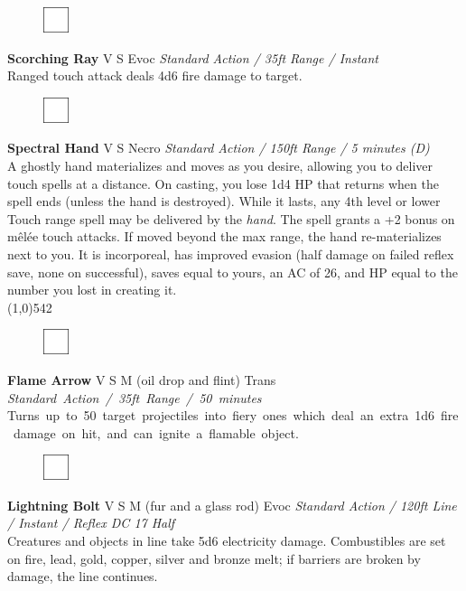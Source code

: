 \documentclass[letterpaper]{article}
\newcommand{\fullline}{\noindent\line(1,0){542} \\}
\newcommand{\spell}[7]{
\begin{figure}
\vspace{-13pt}
\ifstrequal{#2}{Full}{\includegraphics[width=2em]{Checkbox-Full}}{
                      \includegraphics[width=2em]{Checkbox}}
\ifstrequal{#7}{}{\vspace{-1em}}{\vspace{#7}}
\end{figure}
\noindent \textbf{#1} #3 {
    \ifstrequal{#4}{Conj}{\color{Plum}Conj}{%
    \ifstrequal{#4}{Divin}{\color{YellowOrange}Divin}{%
    \ifstrequal{#4}{Ench}{\color{VioletRed}Ench}{%
    \ifstrequal{#4}{Trans}{\color{LimeGreen}Trans}{%
    \ifstrequal{#4}{Evoc}{\color{RedOrange}Evoc}{%
    \ifstrequal{#4}{Illu}{\color{ProcessBlue}Illu}{%
    \ifstrequal{#4}{Abjur}{\color{CadetBlue}Abjur}{%
    \ifstrequal{#4}{Necro}{\color{Red}Necro}{%
}}}}}}}}}
{\footnotesize \emph{#5}} \\
#6
}
\begin{document}
\spell{Scorching Ray}{}{V S}{Evoc}{Standard Action / 35ft Range / Instant}{%
Ranged touch attack deals 4d6 fire damage to target.}{}\\[-1em] %

\spell{Spectral Hand}{}{V S}{Necro}{\emph{Standard Action / 150ft Range / 5 minutes (D)}}{%
A ghostly hand materializes and moves as you desire, allowing you to deliver touch spells at a distance.  On casting, you lose 1d4 HP that returns when the spell ends (unless the hand is destroyed).  While it lasts, any 4th level or lower Touch range spell may be delivered by the \emph{hand}.  The spell grants a +2 bonus on m\^{e}l\'{e}e touch attacks. If moved beyond the max range, the hand re-materializes next to you.  It is incorporeal, has improved evasion (half damage on failed reflex save, none on successful), saves equal to yours, an AC of 26, and HP equal to the number you lost in creating it.}{2em}\\[-2em] %

\fullline
\vspace{-1.25em}


\spell{Flame Arrow}{}{V S M (oil drop and flint)}{Trans}{\mbox{Standard Action / 35ft Range / 50 minutes}}{%
\mbox{Turns up to 50 target projectiles into fiery ones which deal an extra 1d6 fire damage on hit, and can ignite a flamable object.}}{}\\[-1em] %

\spell{Lightning Bolt}{}{V S M (fur and a glass rod)}{Evoc}{Standard Action / 120ft Line / Instant / Reflex DC 17 Half}{%
Creatures and objects in line take 5d6 electricity damage. Combustibles are set on fire, lead, gold, copper, silver and bronze melt; if barriers are broken by damage, the line continues.}{} %

\end{document}
